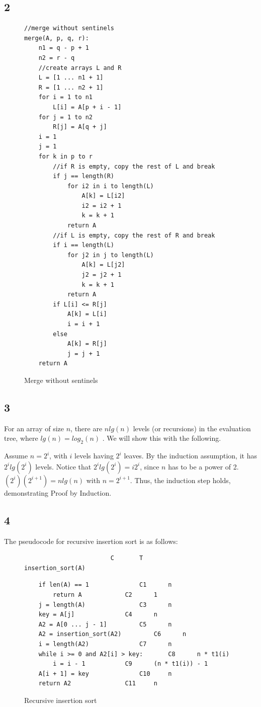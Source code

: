 \documentclass[11pt,letterpaper]{article}
\begin{document}
\subsection*{2}
\begin{figure}[!h]

\begin{lstlisting}
//merge without sentinels
merge(A, p, q, r):
	n1 = q - p + 1
	n2 = r - q
	//create arrays L and R
	L = [1 ... n1 + 1]
	R = [1 ... n2 + 1]
	for i = 1 to n1
		L[i] = A[p + i - 1]	
	for j = 1 to n2
		R[j] = A[q + j]
	i = 1
	j = 1
	for k in p to r
		//if R is empty, copy the rest of L and break
		if j == length(R)
			for i2 in i to length(L)
				A[k] = L[i2]
				i2 = i2 + 1
				k = k + 1
			return A
		//if L is empty, copy the rest of R and break
		if i == length(L)
			for j2 in j to length(L)
				A[k] = L[j2]
				j2 = j2 + 1
				k = k + 1
			return A
		if L[i] <= R[j]
			A[k] = L[i]
			i = i + 1
		else
			A[k] = R[j]
			j = j + 1
	return A
\end{lstlisting}

\caption{Merge without sentinels}
\label{merge_reduce}
\end{figure}


\pagebreak


\subsection*{3}
For an array of size $n$, there are $ n lg (n) $ levels (or recursions) in the evaluation tree, where 
$ lg (n) = log_2 (n) $ . We will show this with the following.

Assume $ n = 2^i $, with $ i $ levels having $ 2^i $ leaves. By the induction assumption, it has 
$ 2^i lg (2^i) $ levels. Notice that $ 2^i lg (2^i) = i2^i $, since $n$ has to be a power of 2. 
$ (2^i)(2^{i + 1}) = n lg (n) $ with $ n = 2^{i + 1} $. Thus, the induction step holds, demonstrating Proof by Induction. 


\subsection*{4}
The pseudocode for recursive insertion sort is as follows:

\begin{figure}[!h]

\scriptsize
\begin{lstlisting}
						C 		T
insertion_sort(A)
\end{lstlisting}

\lstset{numbers=left}
\begin{lstlisting}
	if len(A) == 1				C1		n
		return A 			C2		1
	j = length(A)				C3		n
	key = A[j]				C4		n
	A2 = A[0 ... j - 1]			C5		n
	A2 = insertion_sort(A2)			C6		n
	i = length(A2)				C7		n
	while i >= 0 and A2[i] > key:		C8		n * t1(i)
		i = i - 1			C9		(n * t1(i)) - 1
	A[i + 1] = key				C10		n
	return A2				C11		n
\end{lstlisting}
\normalsize

\caption{Recursive insertion sort}
\label{insertion_sort_rec}
\end{figure}
\end{document}
